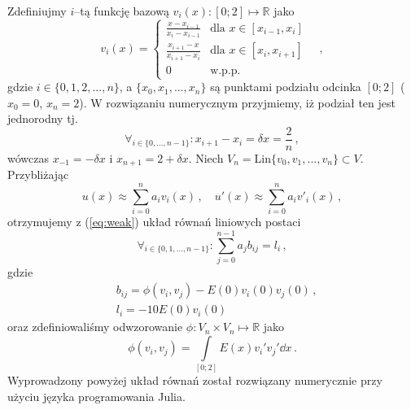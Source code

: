 \documentclass{myclass}
\begin{document}
Zdefiniujmy \(i\)--tą funkcję bazową \(v_i(x):[0;2]\mapsto\mathbb{R}\) jako
\begin{equation}
    v_i(x) = \begin{cases}
        \frac{x-x_{i-1}}{x_i - x_{i-1}}&\text{dla \(x\in [x_{i-1},x_i]\)}\\
        \frac{x_{i+1}-x}{x_{i+1} - x_{i}}&\text{dla \(x\in [x_{i},x_{i+1}]\)}\\
        0&\text{w.p.p.}
    \end{cases}\quad,
\end{equation}
gdzie \(i\in\{0,1,2,...,n\}\), a \(\{x_0,x_1,...,x_n\}\) są punktami podziału
odcinka \([0;2]\) (\(x_0=0\), \(x_n=2\)). W rozwiązaniu numerycznym przyjmiemy,
iż podział ten jest jednorodny tj. 
\begin{equation}
    \forall_{i\in\{0,...,n-1\}}: x_{i+1}-x_{i} = \delta x = \frac{2}{n}\,,
\end{equation}
wówczas \(x_{-1}=-\delta x\) i \(x_{n+1}=2+\delta x\). Niech
\(V_n=\text{Lin}\{v_0,v_1,...,v_n\} \subset V\). Przybliżając
\begin{equation}
    u(x)\approx \sum_{i=0}^na_iv_i(x)\,,\quad u'(x)\approx \sum_{i=0}^na_iv'_i(x)\,,
\end{equation}
otrzymujemy z (\ref{eq:weak}) układ równań liniowych postaci
\begin{equation}
    \forall_{i\in\{0,1,...,n-1\}}: \sum_{j=0}^{n-1} a_jb_{ij} = l_i\,,
\end{equation}
gdzie 
\begin{equation}
    \begin{split}
        &b_{ij} = \phi(v_i,v_j)-E(0)v_i(0)v_j(0)\,,\\
        &l_i =-10E(0)v_i(0)
    \end{split}
\end{equation}
oraz zdefiniowaliśmy odwzorowanie \(\phi:V_n\times V_n\mapsto\mathbb{R}\) jako
\begin{equation}
    \phi(v_i,v_j)=\int\limits_{[0;2]}E(x)v_i'v_j'\dd{x}\,.
\end{equation}
Wyprowadzony powyżej układ równań został rozwiązany numerycznie przy użyciu
języka programowania Julia.
\end{document}
